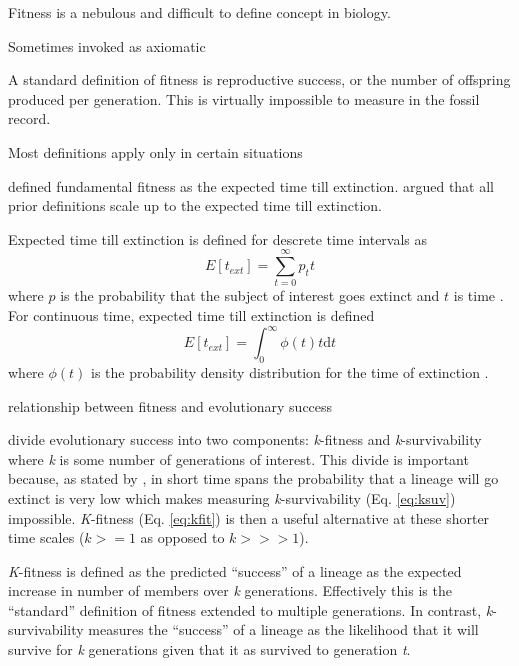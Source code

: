 \documentclass[12pt,letterpaper]{article}
\begin{document}
Fitness is a nebulous and difficult to define concept in biology.

Sometimes invoked as axiomatic

A standard definition of fitness is reproductive success, or the number of offspring produced per generation. This is virtually impossible to measure in the fossil record.

Most definitions apply only in certain situations

\citet{Cooper1984} defined fundamental fitness as the expected time till extinction. \citet{Cooper1984} argued that all prior definitions scale up to the expected time till extinction.

Expected time till extinction is defined for descrete time intervals as 
\begin{equation}
  E[t_{ext}] = \sum_{t = 0}^{\infty} p_{t} t
  \label{eq:ete_d}
\end{equation}
where \(p\) is the probability that the subject of interest goes extinct and \(t\) is time \citep{Cooper1984}. For continuous time, expected time till extinction is defined 
\begin{equation}
  E[t_{ext}] = \int_{0}^{\infty} \phi(t) t \mathrm{d}t
  \label{eq:ete_c}
\end{equation}
where \(\phi(t)\) is the probability density distribution for the time of extinction \citep{Cooper1984}.

relationship between fitness and evolutionary success

\citet{Palmer2012} divide evolutionary success into two components: \textit{k}-fitness and \textit{k}-survivability where \textit{k} is some number of generations of interest. This divide is important because, as stated by \citet{Palmer2012}, in short time spans the probability that a lineage will go extinct is very low which makes measuring \textit{k}-survivability (Eq. \ref{eq:ksuv}) impossible. \textit{K}-fitness (Eq. \ref{eq:kfit}) is then a useful alternative at these shorter time scales (\(k >= 1\) as opposed to \(k >>> 1\)).

\textit{K}-fitness is defined as the predicted ``success'' of a lineage as the expected increase in number of members over \textit{k} generations. Effectively this is the ``standard'' definition of fitness extended to multiple generations. In contrast, \textit{k}-survivability measures the ``success'' of a lineage as the likelihood that it will survive for \textit{k} generations given that it as survived to generation \textit{t}.
\end{document}
